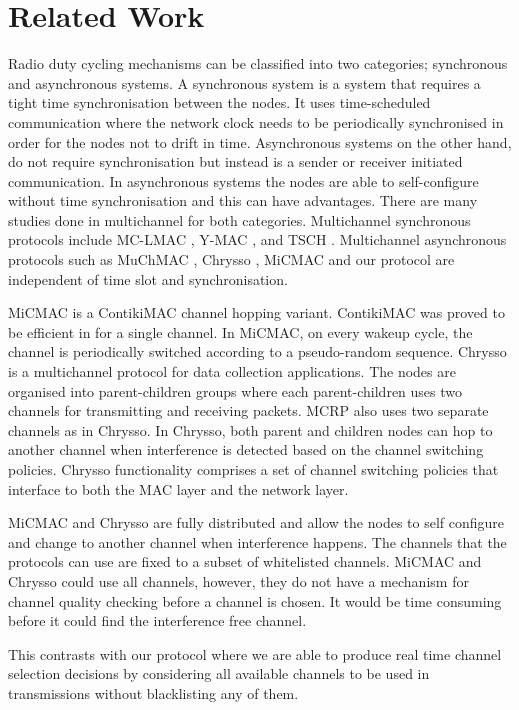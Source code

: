 \section{Related Work}
\label{sec:relatedwork}
Radio duty cycling mechanisms can be classified into two categories; synchronous and asynchronous systems. A synchronous system is a system that requires a tight time synchronisation between the nodes. It uses time-scheduled communication where the network clock needs to be periodically synchronised in order for the nodes not to drift in time. Asynchronous systems on the other hand, do not require synchronisation but instead is a sender or receiver initiated communication. In asynchronous systems the nodes are able to self-configure without time synchronisation and this can have advantages. There are many studies done in multichannel for both categories. Multichannel synchronous protocols include MC-LMAC \cite{mc-lmac}, Y-MAC \cite{y-mac}, and TSCH \cite{tsch}. Multichannel asynchronous protocols such as MuChMAC \cite{muchmac}, Chrysso \cite{chrysso}, MiCMAC \cite{micmac} and our protocol are independent of time slot and synchronisation.  

MiCMAC \cite{micmac} is a ContikiMAC \cite{contikimac} channel hopping variant. ContikiMAC was proved to be efficient in \cite{micmac,orpl} for a single channel. In MiCMAC, on every wakeup cycle, the channel is periodically switched according to a pseudo-random sequence. Chrysso \cite{chrysso} is a multichannel protocol for data collection applications. The nodes are organised into parent-children groups where each parent-children uses two channels for transmitting and receiving packets. MCRP also uses two separate channels as in Chrysso. In Chrysso, both parent and children nodes can hop to another channel when interference is detected based on the channel switching policies. Chrysso functionality comprises a set of channel switching policies that interface to both the MAC layer and the network layer. 

MiCMAC and Chrysso are fully distributed and allow the nodes to self configure and change to another channel when interference happens. The channels that the protocols can use are fixed to a subset of whitelisted channels. MiCMAC and Chrysso could use all channels, however, they do not have a mechanism for channel quality checking before a channel is chosen. It would be time consuming before it could find the interference free channel. 

This contrasts with our protocol where we are able to produce real time channel selection decisions by considering all available channels to be used in transmissions without blacklisting any of them. 

